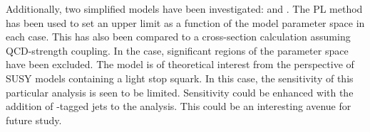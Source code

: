 Additionally, two simplified models have been investigated: \TthreeW and
\Ttwott. The \ac{PL} method has been used to set an upper limit as a function of
the model parameter space in each case. This has also been compared to a
cross-section calculation assuming \ac{QCD}-strength coupling. In the \TthreeW
case, significant regions of the parameter space have been excluded. The \Ttwott
model is of theoretical interest from the perspective of \ac{SUSY} models
containing a light stop squark. In this case, the sensitivity of this particular
analysis is seen to be limited. Sensitivity could be enhanced with the addition
of \Pbottom-tagged jets to the analysis. This could be an interesting avenue for
future study.



